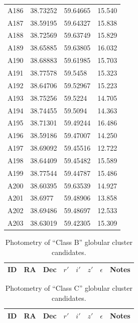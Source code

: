 \documentclass[useAMS,usenatbib]{mn2e}
\begin{document}
\begin{table}
\begin{tabular}{lllc}
	A186 & 38.73252 & 59.64665 & 15.540 \\
	A187 & 38.59195 & 59.64327 & 15.838 \\
	A188 & 38.72569 & 59.63749 & 15.829 \\
	A189 & 38.65885 & 59.63805 & 16.032 \\
	A190 & 38.68883 & 59.61985 & 15.703 \\
	A191 & 38.77578 & 59.5458 & 15.323 \\
	A192 & 38.64706 & 59.52967 & 15.223 \\
	A193 & 38.75256 & 59.5224 & 14.705 \\
	A194 & 38.74455 & 59.5094 & 14.363 \\
	A195 & 38.71301 & 59.49244 & 16.486 \\
	A196 & 38.59186 & 59.47007 & 14.250 \\
	A197 & 38.69092 & 59.45516 & 12.722 \\
	A198 & 38.64409 & 59.45482 & 15.589 \\
	A199 & 38.77544 & 59.44787 & 15.486 \\
	A200 & 38.60395 & 59.63539 & 14.927 \\
	A201 & 38.6977 & 59.48906 & 13.858 \\
	A202 & 38.69486 & 59.48697 & 12.533 \\
	A203 & 38.63019 & 59.42305 & 15.309 \\
	\hline
\end{tabular}
\end{table}


\begin{table}
 \centering
  \caption{Photometry of ``Class B'' globular cluster candidates.}
\label{tab:class_b}  
\begin{tabular}{@{}lllccccl@{}}
  \hline
ID & RA & Dec &$r'$& $i'$& $z'$& $\epsilon$& Notes\\
 \hline

\hline
\end{tabular}
\end{table}

\begin{table}
 \centering
  \caption{Photometry of ``Class C'' globular cluster candidates.}
\label{tab:class_c}  
\begin{tabular}{@{}lllccccl@{}}
  \hline
ID & RA & Dec &$r'$& $i'$& $z'$& $\epsilon$& Notes\\
 \hline

\hline
\end{tabular}
\end{table}

\bsp
\label{lastpage}
\end{document}
